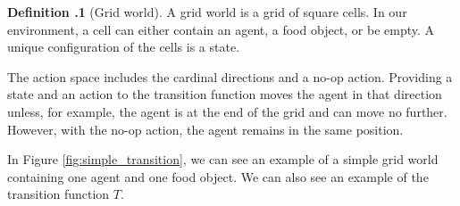 \documentclass[12pt,A4]{report}
\theoremstyle{definition}
\begin{document}

\newpage
\begin{displayquote}
  \textbf{Definition \thesection.1} (Grid world).
  A grid world is a grid of square cells. In our environment, a cell can either contain an agent, a food object, or be empty. A unique configuration of the cells is a state. 
\end{displayquote}

The action space includes the cardinal directions and a no-op action. Providing a state and an action to the transition function moves the agent in that direction unless, for example, the agent is at the end of the grid and can move no further. However, with the no-op action, the agent remains in the same position.

In Figure \ref{fig:simple_transition}, we can see an example of a simple grid world containing one agent and one food object. We can also see an example of the transition function $T$. 


\end{document}
